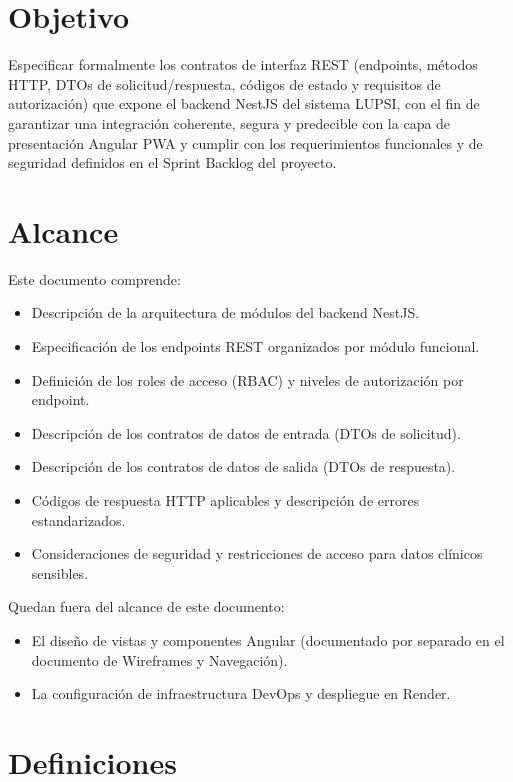 \documentclass[a4paper,12pt]{article}
\begin{document}
\section{Objetivo}
Especificar formalmente los contratos de interfaz REST (endpoints, métodos HTTP, DTOs de solicitud/respuesta, códigos de estado y requisitos de autorización) que expone el backend NestJS del sistema LUPSI, con el fin de garantizar una integración coherente, segura y predecible con la capa de presentación Angular PWA y cumplir con los requerimientos funcionales y de seguridad definidos en el Sprint Backlog del proyecto.

\section{Alcance}
Este documento comprende:

\begin{itemize}
\item Descripción de la arquitectura de módulos del backend NestJS.
\item Especificación de los endpoints REST organizados por módulo funcional.
\item Definición de los roles de acceso (RBAC) y niveles de autorización por endpoint.
\item Descripción de los contratos de datos de entrada (DTOs de solicitud).
\item Descripción de los contratos de datos de salida (DTOs de respuesta).
\item Códigos de respuesta HTTP aplicables y descripción de errores estandarizados.
\item Consideraciones de seguridad y restricciones de acceso para datos clínicos sensibles.
\end{itemize}

Quedan fuera del alcance de este documento:
\begin{itemize}
\item El diseño de vistas y componentes Angular (documentado por separado en el documento de Wireframes y Navegación).
\item La configuración de infraestructura DevOps y despliegue en Render.
\end{itemize}

\section{Definiciones}
\end{document}
